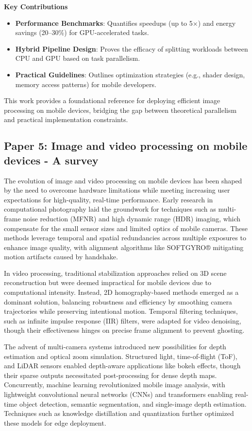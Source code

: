\documentclass[conference]{IEEEtran}
\begin{document}
\textbf{Key Contributions}  
\begin{itemize}
    \item \textbf{Performance Benchmarks}: Quantifies speedups (up to 5×) and energy savings (20–30\%) for GPU-accelerated tasks.
    \item \textbf{Hybrid Pipeline Design}: Proves the efficacy of splitting workloads between CPU and GPU based on task parallelism.
    \item \textbf{Practical Guidelines}: Outlines optimization strategies (e.g., shader design, memory access patterns) for mobile developers.
\end{itemize}

\noindent This work provides a foundational reference for deploying efficient image processing on mobile devices, bridging the gap between theoretical parallelism and practical implementation constraints.



\subsection{Paper 5: Image and video processing on mobile devices - A survey}



The evolution of image and video processing on mobile devices has been shaped by the need to overcome hardware limitations while meeting increasing user expectations for high-quality, real-time performance. Early research in computational photography laid the groundwork for techniques such as multi-frame noise reduction (MFNR) and high dynamic range (HDR) imaging, which compensate for the small sensor sizes and limited optics of mobile cameras. These methods leverage temporal and spatial redundancies across multiple exposures to enhance image quality, with alignment algorithms like SOFTGYRO® mitigating motion artifacts caused by handshake.  

In video processing, traditional stabilization approaches relied on 3D scene reconstruction but were deemed impractical for mobile devices due to computational intensity. Instead, 2D homography-based methods emerged as a dominant solution, balancing robustness and efficiency by smoothing camera trajectories while preserving intentional motion. Temporal filtering techniques, such as infinite impulse response (IIR) filters, were adapted for video denoising, though their effectiveness hinges on precise frame alignment to prevent ghosting.  

The advent of multi-camera systems introduced new possibilities for depth estimation and optical zoom simulation. Structured light, time-of-flight (ToF), and LiDAR sensors enabled depth-aware applications like bokeh effects, though their sparse outputs necessitated post-processing for dense depth maps. Concurrently, machine learning revolutionized mobile image analysis, with lightweight convolutional neural networks (CNNs) and transformers enabling real-time object detection, semantic segmentation, and single-image depth estimation. Techniques such as knowledge distillation and quantization further optimized these models for edge deployment.  
\end{document}
